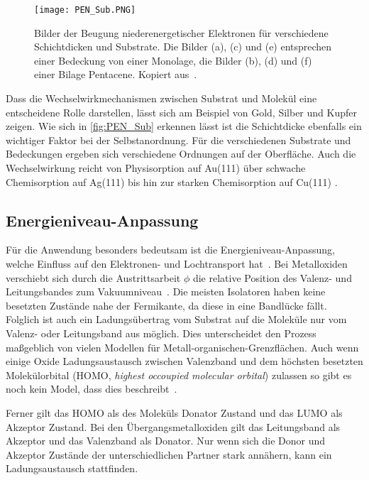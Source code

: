             \begin{figure}
                \centering
                \texttt{[image: PEN\_Sub.PNG]}
                \caption{Bilder der Beugung niederenergetischer Elektronen für verschiedene Schichtdicken und Substrate.
                Die Bilder (a), (c) und (e) entsprechen einer Bedeckung von einer Monolage, die Bilder (b), (d) und (f) einer Bilage Pentacene.
                Kopiert aus~\cite{5A_4}.}
                \label{fig:PEN_Sub}
            \end{figure}
            Dass die Wechselwirkmechanismen zwischen Substrat und Molekül eine entscheidene Rolle darstellen, lässt sich am Beispiel von Gold, Silber und Kupfer zeigen.
            Wie sich in \autoref{fig:PEN_Sub} erkennen lässt ist die Schichtdicke ebenfalls ein wichtiger Faktor bei der Selbstanordnung.
            Für die verschiedenen Substrate und Bedeckungen ergeben sich verschiedene Ordnungen auf der Oberfläche.
            Auch die Wechselwirkung reicht von Physisorption auf Au(111) über schwache Chemisorption auf Ag(111) bis hin zur starken Chemisorption auf Cu(111) \cite{5A_4}.
        
        \FloatBarrier
        \subsection{Energieniveau-Anpassung} \label{sec:ENA}
            Für die Anwendung besonders bedeutsam ist die Energieniveau-Anpassung, welche Einfluss auf den Elektronen- und Lochtransport hat~\cite{IF_4}.
            Bei Metalloxiden verschiebt sich durch die Austrittsarbeit $\phi$ die relative Position des Valenz- und Leitungsbandes zum Vakuumniveau~\cite{IF_3}.
            Die meisten Isolatoren haben keine besetzten Zustände nahe der Fermikante, da diese in eine Bandlücke fällt.
            Folglich ist auch ein Ladungsübertrag vom Substrat auf die Moleküle nur vom Valenz- oder Leitungsband aus möglich.
            Dies unterscheidet den Prozess maßgeblich von vielen Modellen für Metall-organischen-Grenzflächen.
            Auch wenn einige Oxide Ladungsaustausch zwischen Valenzband und dem höchsten besetzten Molekülorbital (HOMO, \textit{highest occoupied molecular orbital}) zulassen so  gibt es noch kein Model, dass dies beschreibt~\cite{IF_3}.

            Ferner gilt das HOMO als des Moleküls Donator Zustand und das LUMO als Akzeptor Zustand.
            Bei den Übergangsmetalloxiden gilt das Leitungsband als Akzeptor und das Valenzband als Donator. 
            Nur wenn sich die Donor und Akzeptor Zustände der unterschiedlichen Partner stark annähern, kann ein Ladungsaustausch stattfinden.


